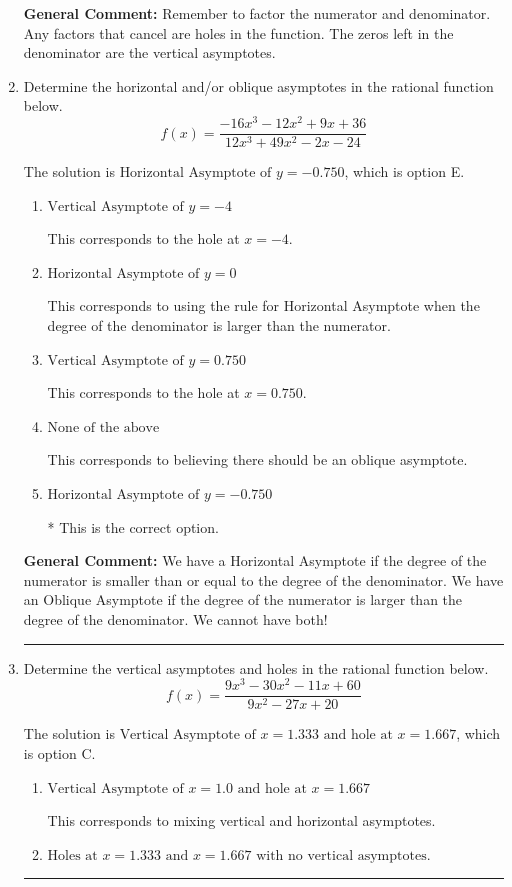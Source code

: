 \documentclass{extbook}[14pt]
\newcommand{\litem}[1]{\item #1

\rule{\textwidth}{0.4pt}}
\begin{document}
\begin{enumerate}
{\textbf{General Comment:} Remember to factor the numerator and denominator. Any factors that cancel are holes in the function. The zeros left in the denominator are the vertical asymptotes.
}
\litem{
Determine the horizontal and/or oblique asymptotes in the rational function below.
\[ f(x) = \frac{-16x^{3} -12 x^{2} +9 x + 36}{12x^{3} +49 x^{2} -2 x -24} \]

The solution is \( \text{Horizontal Asymptote of } y = -0.750  \), which is option E.\begin{enumerate}[label=\Alph*.]
\item \( \text{Vertical Asymptote of } y = -4  \)

This corresponds to the hole at $x = -4$.
\item \( \text{Horizontal Asymptote of } y = 0  \)

This corresponds to using the rule for Horizontal Asymptote when the degree of the denominator is larger than the numerator.
\item \( \text{Vertical Asymptote of } y = 0.750  \)

This corresponds to the hole at $x = 0.750$.
\item \( \text{None of the above} \)

This corresponds to believing there should be an oblique asymptote.
\item \( \text{Horizontal Asymptote of } y = -0.750  \)

* This is the correct option.
\end{enumerate}

\textbf{General Comment:} We have a Horizontal Asymptote if the degree of the numerator is smaller than or equal to the degree of the denominator. We have an Oblique Asymptote if the degree of the numerator is larger than the degree of the denominator. We cannot have both!
}
\litem{
Determine the vertical asymptotes and holes in the rational function below.
\[ f(x) = \frac{9x^{3} -30 x^{2} -11 x + 60}{9x^{2} -27 x + 20} \]

The solution is \( \text{Vertical Asymptote of } x = 1.333 \text{ and hole at } x = 1.667 \), which is option C.\begin{enumerate}[label=\Alph*.]
\item \( \text{Vertical Asymptote of } x = 1.0 \text{ and hole at } x = 1.667 \)

This corresponds to mixing vertical and horizontal asymptotes.
\item \( \text{Holes at } x = 1.333 \text{ and } x = 1.667 \text{ with no vertical asymptotes.} \)


\end{enumerate}}
\end{enumerate}
\end{document}
